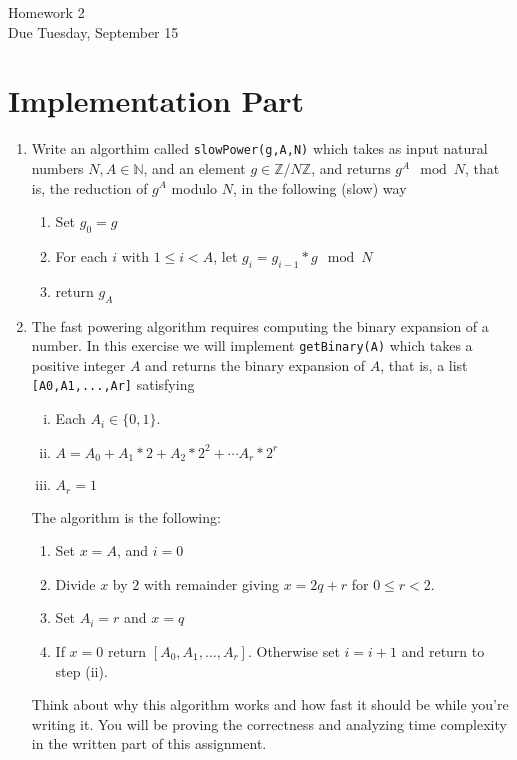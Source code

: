 \documentclass[11pt]{article}
\newcommand{\bN}{\mathbb{N}}
\newcommand{\bZ}{\mathbb{Z}}
\begin{document}
\begin{center}
\Large {Homework 2}\\
\small {Due Tuesday, September 15}
\end{center}
\section*{Implementation Part}
\begin{enumerate}
  \item{
  Write an algorthim called \verb|slowPower(g,A,N)| which takes as input natural numbers $N,A\in\bN$, and an element $g\in\bZ/N\bZ$, and returns $g^A\mod N$, that is, the reduction of $g^A$ modulo $N$, in the following (slow) way
  \begin{enumerate}[(1)]
    \item{Set $g_0 = g$}
    \item{For each $i$ with $1\le i<A$, let $g_i = g_{i-1}*g\mod N$}
    \item{return $g_A$}
  \end{enumerate}
  }
  \item{
  The fast powering algorithm requires computing the binary expansion of a number.  In this exercise we will implement \verb|getBinary(A)| which takes a positive integer $A$ and returns the binary expansion of $A$, that is, a list \verb|[A0,A1,...,Ar]| satisfying
  \begin{enumerate}[(i)]
    \item{
    Each $A_i\in\{0,1\}$.
    }
    \item{
    $A = A_0 + A_1*2 + A_2 * 2^2 + \cdots A_r * 2^r$
    }
    \item{
    $A_r = 1$
    }
  \end{enumerate}
  The algorithm is the following:
  \begin{enumerate}[(1)]
    \item{
    Set $x = A$, and $i = 0$
    }
    \item{
    Divide $x$ by $2$ with remainder giving $x = 2q + r$ for $0\le r<2$.
    }
    \item{
    Set $A_i = r$ and $x = q$
    }
    \item{
    If $x = 0$ return $[A_0,A_1,...,A_r]$.  Otherwise set $i = i+1$ and return to step (ii).
    }
  \end{enumerate}
  Think about why this algorithm works and how fast it should be while you're writing it.  You will be proving the correctness and analyzing time complexity in the written part of this assignment.
}
\end{enumerate}
\end{document}
